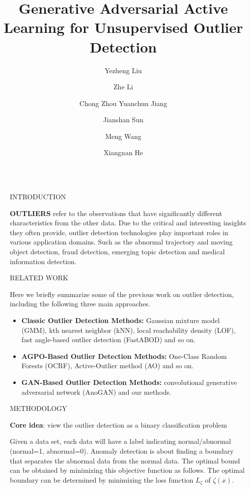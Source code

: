 \documentclass[final]{beamer}
\title{Generative Adversarial Active Learning for
	Unsupervised Outlier Detection}
\author{Yezheng Liu \inst{1} \and Zhe Li \inst{2} \and  Chong Zhou \inst{2} Yuanchun Jiang \inst{2} \and Jianshan Sun \inst{2}  \and Meng Wang \inst{2} \and Xiangnan He \inst{2} }
\institute[shortinst]{\inst{1} Some Institute \samelineand \inst{2} Another Institute}
\newlength{\sepwidth}
\newlength{\colwidth}
\newcommand{\separatorcolumn}{\begin{column}{\sepwidth}\end{column}}
\begin{document}
\begin{frame}[t]
\begin{columns}[t]
\separatorcolumn

\begin{column}{\colwidth}

  \begin{block}{INTRODUCTION}

    \textbf{OUTLIERS} refer to the observations that have significantly different characteristics from the other data. Due to the critical and interesting insights they often provide, outlier detection technologies play important roles in various application domains. Such as the abnormal trajectory and moving object detection, fraud detection, emerging topic detection and medical information detection.

  \end{block}


  \begin{block}{RELATED WORK}

    Here we briefly summarize some of the previous work on outlier detection, including the following three main approaches.

    \begin{itemize}
    	
      \item \textbf{Classic Outlier Detection Methods:} \justifying Gaussian mixture model (GMM), kth nearest neighbor (kNN), local reachability density (LOF), fast angle-based outlier detection (FastABOD) and so on.
      \item \textbf{AGPO-Based Outlier Detection Methods:} \justifying One-Class Random Forests (OCRF), Active-Outlier method (AO) and so on.
      \item \textbf{GAN-Based Outlier Detection Methods:}
      \justifying convolutional generative adversarial network (AnoGAN) and our methods.
      
    \end{itemize}

  \end{block}

  \begin{alertblock}{METHODOLOGY}
	
	\textbf{Core idea}: view the outlier detection as a binary classification problem
	
	Given a data set, each data will have a label indicating normal/abnormal (normal=1, abnormal=0). Anomaly detection is about finding a boundary that separates the abnormal data from the normal data. The optimal bound can be obtained by minimizing this objective function as follows. The optimal boundary can be determined by minimizing the loss function $L_{\zeta}$ of $\zeta(x)$.
	

\end{alertblock}
\end{column}
\end{columns}
\end{frame}
\end{document}
